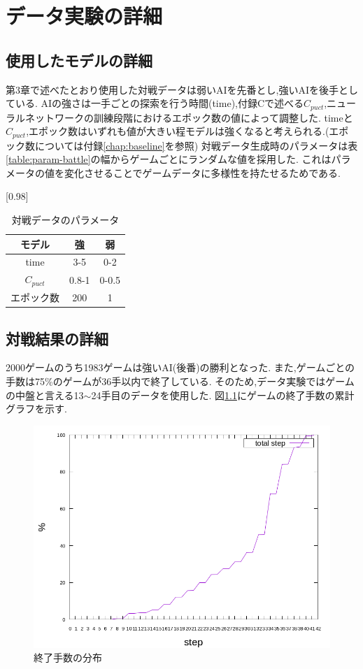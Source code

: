 \chapter{データ実験の詳細}
\label{chap:data}
\section{使用したモデルの詳細}
第3章で述べたとおり使用した対戦データは弱いAIを先番とし,強いAIを後手としている.
AIの強さは一手ごとの探索を行う時間(time),付録Cで述べる$C_{puct}$,ニューラルネットワークの訓練段階におけるエポック数の値によって調整した.
timeと$C_{puct}$,エポック数はいずれも値が大きい程モデルは強くなると考えられる.(エポック数については付録\ref{chap:baseline}を参照)
対戦データ生成時のパラメータは表\ref{table:param-battle}の幅からゲームごとにランダムな値を採用した.
これはパラメータの値を変化させることでゲームデータに多様性を持たせるためである.
\begin{table}[H]
	\caption{対戦データのパラメータ}
	\label{table:param-battle}
	\centering
	\scalebox{0.98}[0.98]{
		\begin{tabular}{c|c|c}
			モデル&強&弱\\ \hline
			time    & 3-5 & 0-2 \\ 
			$C_{puct}$ & 0.8-1   & 0-0.5 \\
			エポック数 & 200 & 1 \\

		\end{tabular}
	}
	\label{table:battle}
\end{table}

\section{対戦結果の詳細}
2000ゲームのうち1983ゲームは強いAI(後番)の勝利となった.
また,ゲームごとの手数は75\%のゲームが36手以内で終了している.
そのため,データ実験ではゲームの中盤と言える13$\sim$24手目のデータを使用した.
図\ref{fig:stepCum}にゲームの終了手数の累計グラフを示す.
\begin{figure}[t]
	\centering
	\includegraphics[width=\linewidth]{./figure/stepCum.png}
	\caption{終了手数の分布}
	\label{fig:stepCum}
\end{figure}
